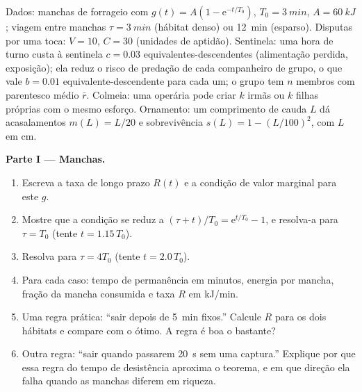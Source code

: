 \begin{problem}
\label{pb:b3:behavioural-ecology:1}
Dados: manchas de forrageio com $g(t) = A(1 - \mathrm{e}^{-t/T_{0}})$,
$T_{0}
= \qty{3}{min}$, $A = \qty{60}{kJ}$; viagem entre manchas $\tau =
\qty{3}{min}$ (hábitat denso) ou \qty{12}{min} (esparso). Disputas por
uma toca: $V = 10$, $C = 30$ (unidades de aptidão). Sentinela: uma hora
de turno custa à sentinela $c = 0.03$ equivalentes-descendentes
(alimentação perdida, exposição); ela reduz o risco de predação de cada
companheiro de grupo, o que vale $b = 0.01$ equivalente-descendente para
cada um; o grupo tem $n$ membros com parentesco médio $\bar r$. Colmeia:
uma operária pode criar $k$ irmãs ou $k$ filhas próprias com o mesmo
esforço. Ornamento: um comprimento de cauda $L$ dá acasalamentos $m(L) = L/20$ e sobrevivência $s(L) = 1 - (L/100)^{2}$, com $L$ em cm.

\medskip
\noindent\textbf{Parte I --- Manchas.}
\begin{enumerate}
  \item Escreva a taxa de longo prazo $R(t)$ e a condição de valor
        marginal para este $g$.
  \item Mostre que a condição se reduz a $(\tau + t)/T_{0} = \mathrm{e}^{t/T_{0}}
        - 1$, e resolva-a para $\tau = T_{0}$ (tente
        $t = 1.15\,T_{0}$).
  \item Resolva para $\tau = 4T_{0}$ (tente $t = 2.0\,T_{0}$).
  \item Para cada caso: tempo de permanência em minutos, energia por
        mancha, fração da mancha consumida e taxa $R$ em kJ/min.
  \item Uma regra prática: ``sair depois de \qty{5}{min} fixos.''
        Calcule $R$ para os dois hábitats e compare com o ótimo. A regra
        é boa o bastante?
  \item Outra regra: ``sair quando passarem \qty{20}{s} sem uma
        captura.'' Explique por que essa regra do tempo de desistência
        aproxima o teorema, e em que direção ela falha quando as manchas
        diferem em riqueza.
\end{enumerate}


\end{problem}
